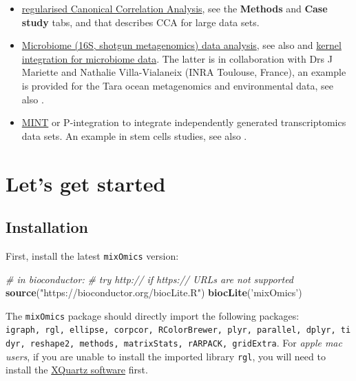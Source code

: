 \documentclass[]{book}
\newenvironment{Shaded}{\begin{snugshade}}{\end{snugshade}}
\newcommand{\KeywordTok}[1]{\textcolor[rgb]{0.13,0.29,0.53}{\textbf{#1}}}
\newcommand{\StringTok}[1]{\textcolor[rgb]{0.31,0.60,0.02}{#1}}
\newcommand{\CommentTok}[1]{\textcolor[rgb]{0.56,0.35,0.01}{\textit{#1}}}
\newcommand{\NormalTok}[1]{#1}
\theoremstyle{definition}
\theoremstyle{definition}
\theoremstyle{definition}
\theoremstyle{remark}
\begin{document}
\begin{itemize}
\item
  \href{http://www.mixOmics.org}{regularised Canonical Correlation
  Analysis}, see the \textbf{Methods} and \textbf{Case study} tabs, and
  \citep{Gon08} that describes CCA for large data sets.
\item
  \href{http://www.mixOmics.org/mixmc}{Microbiome (16S, shotgun
  metagenomics) data analysis}, see also \citep{Lec16} and
  \href{http://mixomics.org/mixkernel}{kernel integration for microbiome
  data}. The latter is in collaboration with Drs J Mariette and Nathalie
  Villa-Vialaneix (INRA Toulouse, France), an example is provided for
  the Tara ocean metagenomics and environmental data, see also
  \citep{Mar17}.
\item
  \href{http://mixomics.org/mixmint/}{MINT} or P-integration to
  integrate independently generated transcriptomics data sets. An
  example in stem cells studies, see also \citep{Roh16}.
\end{itemize}

\chapter{Let's get started}\label{start}

\section{Installation}\label{installation}

First, install the latest \texttt{mixOmics} version:

\begin{Shaded}
\begin{Highlighting}[]
\CommentTok{# in bioconductor:}
\CommentTok{# try http:// if https:// URLs are not supported}
\KeywordTok{source}\NormalTok{(}\StringTok{"https://bioconductor.org/biocLite.R"}\NormalTok{)}
\KeywordTok{biocLite}\NormalTok{(}\StringTok{'mixOmics'}\NormalTok{)}
\end{Highlighting}
\end{Shaded}

The \texttt{mixOmics} package should directly import the following
packages:
\texttt{igraph,\ rgl,\ ellipse,\ corpcor,\ RColorBrewer,\ plyr,\ parallel,\ dplyr,\ tidyr,\ reshape2,\ methods,\ matrixStats,\ rARPACK,\ gridExtra}.
For \emph{apple mac users}, if you are unable to install the imported
library \texttt{rgl}, you will need to install the
\href{https://www.xquartz.org}{XQuartz software} first.
\end{document}
